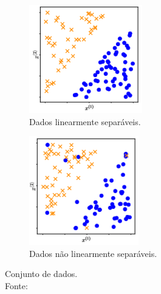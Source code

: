 \documentclass[12pt,a4paper]{scrartcl}
\theoremstyle{definition}%
\begin{document}
\begin{figure}[htbp] 
	\centering
	\begin{subfigure}[h]{0.32\textwidth}
		\centering
		\includegraphics[width=\textwidth]{dados_linearmenteseparaveismmll}
		\caption{Dados linearmente separáveis. \label{fig:dados_linearmente_separaveis_e_nao_separaveis:a}}
	\end{subfigure}
	\begin{subfigure}[h]{0.31\textwidth}
		\centering
		\includegraphics[width=\textwidth]{dados_nlinearmenteseparaveismml}
		\caption{Dados não linearmente separáveis. \label{fig:dados_linearmente_separaveis_e_nao_separaveis:b}}
	\end{subfigure}
\caption{Conjunto de dados. \label{fig:dados_linearmente_separaveis_e_nao_separaveis} \\ Fonte: \textcite{Faisal2019} }
\end{figure}
\end{document}
